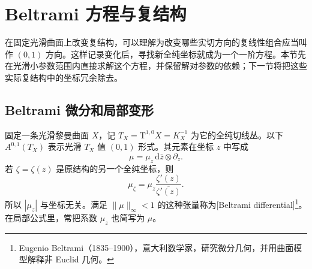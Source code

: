 
% 
% 

\section{Beltrami 方程与复结构}
\label{g4:sec:0602}

在固定光滑曲面上改变复结构，可以理解为改变哪些实切方向的复线性组合应当叫作 \((0,1)\) 方向。这样记录变化后，寻找新全纯坐标就成为一个一阶方程。本节先在光滑小参数范围内直接求解这个方程，并保留解对参数的依赖；下一节将把这些实际复结构中的坐标冗余除去。

\subsection{Beltrami 微分和局部变形}
\label{g4:subsec:0602:01}

固定一条光滑黎曼曲面 \(X\)，记 \(T_X=\mathrm{T}^{1,0}X=K_X^{-1}\) 为它的全纯切线丛。以下 \(A^{0,1}(T_X)\) 表示光滑 \(T_X\) 值 \((0,1)\) 形式。其元素在坐标 \(z\) 中写成
\[
	\mu=\mu_z\,\mathrm{d}\overline z\otimes\partial_z.
\]
若 \(\zeta=\zeta(z)\) 是原结构的另一个全纯坐标，则
\begin{equation}\label{g4:eq:0602:beltrami-transition}
	\mu_\zeta=\mu_z\frac{\zeta'(z)}{\overline{\zeta'(z)}}.
\end{equation}
所以 \(|\mu_z|\) 与坐标无关。满足 \(\|\mu\|_\infty<1\) 的这种张量称为[Beltrami differential]\footnote{Eugenio Beltrami（1835--1900），意大利数学家，研究微分几何，并用曲面模型解释非 Euclid 几何。}。在局部公式里，常把系数 \(\mu_z\) 也简写为 \(\mu\)。

